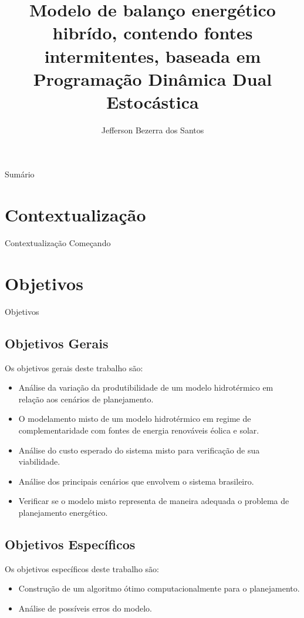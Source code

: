 \documentclass[12pt]{beamer}
\title{Modelo de balan\c co energ\'etico hibr\'ido, contendo fontes intermitentes, baseada em  Programa\c{c}\~{a}o Din\^{a}mica Dual Estoc\'{a}stica}
\author{Jefferson Bezerra dos Santos}
\institute{Universidade Federal da Para\'iba }
\begin{document}
\begin{frame}
\titlepage %
\end{frame}

\begin{frame}{Sum\'ario}
\tableofcontents
\end{frame}

\section{Contextualiza\c c\~ao}
\begin{frame}{Contextualiza\c c\~ao}
Come\c cando	
\end{frame}

\section{Objetivos}
\begin{frame}{Objetivos}
\subsection{Objetivos Gerais}
Os objetivos gerais deste trabalho s\~ao:
\begin{itemize}
	\item An\'alise da varia\c c\~ao da produtibilidade de um modelo hidrot\'ermico em rela\c c\~ao aos cen\'arios de
		planejamento. 
	\item O modelamento misto de um modelo hidrot\'ermico em regime de complementaridade com fontes de energia renov\'aveis \'eolica e solar.
	\item An\'alise do custo esperado do sistema misto para verifica\c c\~ao de sua viabilidade.
	\item An\'alise dos principais cen\'arios que envolvem o sistema brasileiro. 
	\item Verificar se o modelo misto representa de maneira adequada o problema de planejamento energ\'etico.
\end{itemize}
\end{frame}

\begin{frame}
	\begin{justify}	
	\subsection{Objetivos Espec\'ificos}
	Os objetivos espec\'ificos deste trabalho s\~ao:
	\begin{itemize}
		\item Constru\c c\~ao de um algoritmo \'otimo  computacionalmente para o planejamento. 
		\item An\'alise de poss\'iveis erros do modelo.
	\end{itemize}
	\end{justify}
\end{frame}
\end{document}
